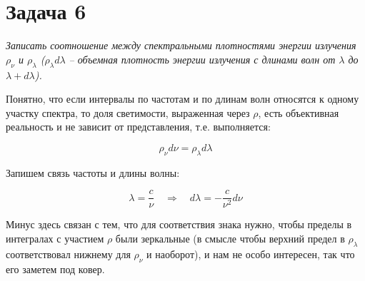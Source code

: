 \documentclass[a4paper, 12pt]{article}
\newcommand{\qrq}
{\ensuremath{\quad \Rightarrow \quad}} %
\newcommand{\med}[1]
{\ensuremath{\langle#1\rangle}}
\begin{document}
\section{Задача 6}

\textit{Записать соотношение между спектральными плотностями энергии излучения $\rho_\nu$ и $\rho_\lambda$ ($\rho_\lambda d\lambda$ – объемная плотность энергии излучения с длинами волн от $\lambda$ до $\lambda + d\lambda$).}







Понятно, что если интервалы по частотам и по длинам волн относятся к одному участку спектра, то доля светимости, выраженная через $\rho$, есть объективная реальность и не зависит от представления, т.е. выполняется:

\begin{equation}
	\rho_\nu d\nu = \rho_\lambda d\lambda
\end{equation}

Запишем связь частоты и длины волны:

\begin{equation}
	\lambda = \frac{c}{\nu} \qrq d\lambda = -\frac{c}{\nu^2} d\nu
\end{equation}

Минус здесь связан с тем, что для соответствия знака нужно, чтобы пределы в интегралах с участием $\rho$ были зеркальные (в смысле чтобы верхний предел в $\rho_\lambda$ соответствовал нижнему для $\rho_\nu$ и наоборот), и нам не особо интересен, так что его заметем под ковер.
\end{document}
